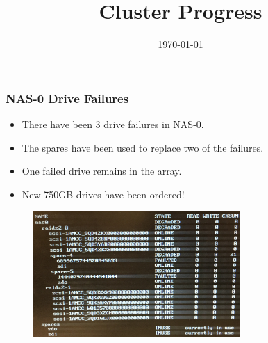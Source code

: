\documentclass{beamer}
\title{Cluster Progress}
\date{\today}
\begin{document}

\begin{frame}
  \maketitle
\end{frame}



\begin{frame}

  \frametitle{NAS-0 Drive Failures}

  \begin{itemize}
    \item There have been 3 drive failures in NAS-0.
    \item The spares have been used to replace two of the failures.
    \item One failed drive remains in the array.
    \item New 750GB drives have been ordered!
  \end{itemize}

  \begin{figure}[H]
    \begin{center}
      \includegraphics[width=0.7\textwidth]{nas0status.JPG}
    \end{center}
  \end{figure}

\end{frame}


\end{document}

